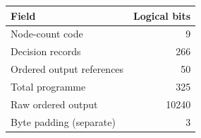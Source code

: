 \begin{tabular}{lr}
\toprule
Field & Logical bits \\
\midrule
Node-count code & 9 \\
Decision records & 266 \\
Ordered output references & 50 \\
Total programme & 325 \\
Raw ordered output & 10240 \\
Byte padding (separate) & 3 \\
\bottomrule
\end{tabular}
